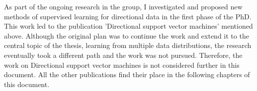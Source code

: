 As part of the ongoing research in the group, I investigated and proposed new methods of supervised learning for directional data in the first phase of the PhD. This work led to the publication 'Directional support vector machines' mentioned above. Although the original plan was to continue the work and extend it to the central topic of the thesis, learning from multiple data distributions, the research eventually took a different path and the work was not pursued. Therefore, the work on Directional support vector machines is not considered further in this document. All the other publications find their place in the following chapters of this document.
